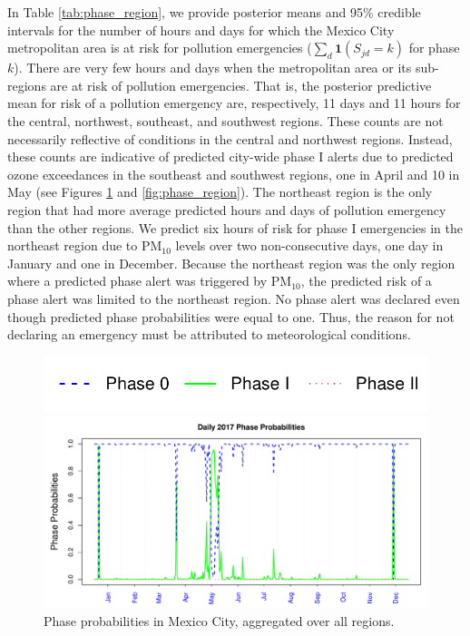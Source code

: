\documentclass[alpha-refs]{wiley-article}
\newcommand{\bone}{\textbf{1}}
\begin{document}
In Table \ref{tab:phase_region}, we provide posterior means and 95\% credible intervals for the number of hours and days for which the Mexico City metropolitan area is at risk for pollution emergencies ($\sum_d \bone(S_{jd} = k) $ for phase $k$). There are very few hours and days when the metropolitan area or its sub-regions are at risk of pollution emergencies. That is, the posterior predictive mean for risk of a pollution emergency are, respectively, 11 days and 11 hours for the central, northwest, southeast, and southwest regions. These counts are not necessarily reflective of conditions in the central and northwest regions. Instead, these counts are indicative of predicted city-wide phase I alerts due to predicted ozone exceedances in the southeast and southwest regions, one in April and 10 in May (see Figures \ref{fig:phase_all} and \ref{fig:phase_region}). The northeast region is the only region that had more average predicted hours and days of pollution emergency than the other regions. We predict six hours of risk for phase I emergencies in the northeast region due to $\text{PM}_{10}$ levels over two non-consecutive days, one day in January and one in December. Because the northeast region was the only region where a predicted phase alert was triggered by $\text{PM}_{10}$, the predicted risk of a phase alert was limited to the northeast region. No phase alert was declared even though predicted phase probabilities were equal to one. Thus, the reason for not declaring an emergency must be attributed to meteorological conditions.

\vspace{-6mm}

\begin{figure}[H]
  \begin{center}
    \hspace{.1\textwidth}
  \includegraphics[width=.6\textwidth]{phase_legend2}

  \vspace{-6mm}
      \includegraphics[width=\textwidth]{phase_prob_all_day}
  \end{center}
  \vspace{-8mm}
       \caption{Phase probabilities in Mexico City, aggregated over all regions.}\label{fig:phase_all}
\end{figure}
\end{document}
